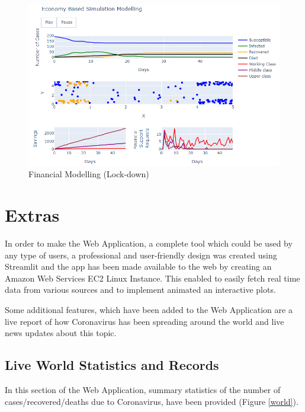 \begin{figure}[ht!]%
    \centering
    \includegraphics[width=13cm]{latex/images/fin2.PNG}%
    \caption{Financial Modelling (Lock-down)}
    \label{fin2}
\end{figure}

\section{Extras}
In order to make the Web Application, a complete tool which could be used by any type of users, a professional and user-friendly design was created using Streamlit and the app has been made available to the web by creating an Amazon Web Services EC2 Linux Instance. This enabled to easily fetch real time data from various sources and to implement animated an interactive plots.

Some additional features, which have been added to the Web Application are a live report of how Coronavirus has been spreading around the world and live news updates about this topic.

\subsection{Live World Statistics and Records}

In this section of the Web Application, summary statistics of the number of cases/recovered/deaths due to Coronavirus, have been provided (Figure \ref{world}). 

